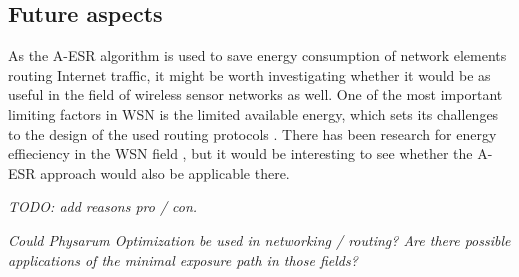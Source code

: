 \documentclass{IWORK2014}
\begin{document}
\subsection{Future aspects}
As the A-ESR algorithm is used to save energy consumption of network elements routing Internet traffic, it might be worth investigating whether it would be as useful in the field of wireless sensor networks as well. One of the most important limiting factors in WSN is the limited available energy, which sets its challenges to the design of the used routing protocols \cite{hylsberg2011bioinspired}. There has been research for energy effieciency in the WSN field \cite{wightman2008a3}, but it would be interesting to see whether the A-ESR approach would also be applicable there.

\textit{TODO: add reasons pro / con.}

\textit{Could Physarum Optimization be used in networking / routing? Are there possible applications of the minimal exposure path in those fields?}



\end{document}
